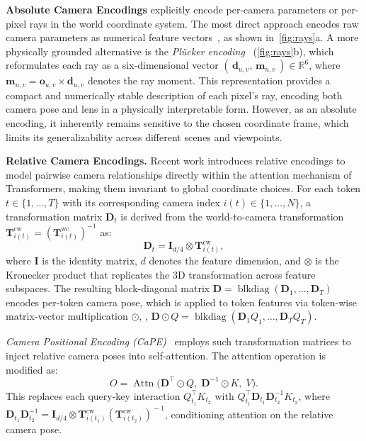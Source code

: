 \noindent\textbf{Absolute Camera Encodings}
{explicitly encode per-camera parameters or per-pixel rays in the world coordinate system.}
The most direct approach encodes raw camera parameters as numerical feature vectors~\cite{wang2024motionctrl,bai2025recammaster}, as shown in~\cref{fig:rays}a.
A more physically grounded alternative is the \emph{Pl\"ucker encoding}~\cite{bahmani2025ac3d,he2024cameractrl} (\cref{fig:rays}b), which reformulates each ray as a six-dimensional vector
\((\,\bm{d}_{{u},{v}},\, \bm{m}_{{u},{v}}\,) \in \mathbb{R}^6\),
where \(\bm{m}_{{u},{v}} = \bm{o}_{{u},{v}} \times \bm{d}_{{u},{v}}\) denotes the ray moment.
This representation provides a compact and numerically stable description of each pixel's ray, encoding both camera pose and lens in a physically interpretable form.
However, as an absolute encoding, it %
inherently remains sensitive to the chosen coordinate frame, which limits its generalizability across different scenes and viewpoints.

\noindent\textbf{Relative Camera Encodings.}
Recent work introduces relative encodings to model pairwise camera relationships directly within the attention mechanism of Transformers, making them invariant to global coordinate choices.
For each token \({t} \in \{1, \ldots, T\}\) with its corresponding camera index \({i}({t}) \in \{1, \ldots, N\}\),
a transformation matrix \(\mathbf{D}_{t}\) is derived from the world-to-camera transformation \(\mathbf{T}_{i({t})}^{\textrm{cw}} = (\mathbf{T}_{{i}({t})}^{\textrm{wc}})^{-1}\) as:
\begin{equation}
\mathbf{D}_{t} = \mathbf{I}_{{d}/4} \otimes \mathbf{T}_{{i}({t})}^{\textrm{cw}},
\label{eq:D_construct}
\end{equation}
where \(\mathbf{I}\) is the identity matrix, \({d}\) denotes the feature dimension, and \(\otimes\) is the Kronecker product that replicates the 3D transformation across feature subspaces.
The resulting block-diagonal matrix
\(\mathbf{D} = \operatorname{blkdiag}(\mathbf{D}_1,\ldots,\mathbf{D}_{T})\)
encodes per-token camera pose, which is applied to token features via token-wise matrix-vector multiplication \(\odot\),
\eg, \(\mathbf{D}\odot {Q} = \operatorname{blkdiag}(\mathbf{D}_1 {Q}_1, \ldots, \mathbf{D}_{T} {Q}_{T})\).

\emph{Camera Positional Encoding (CaPE)}~\cite{kong2024eschernet} employs such transformation matrices to inject relative camera poses into self-attention.
The attention operation is modified as:
\begin{equation}
{O}
= \operatorname{Attn}\big(\mathbf{D}^{\!\top}\!\odot {Q},\; \mathbf{D}^{-1}\!\odot {K},\; {V}\big).
\label{eq:cape}
\end{equation}
This replaces each query-key interaction \(Q_{{t}_1}^\top K_{{t}_2}\) with \({Q}_{{t}_1}^\top \mathbf{D}_{{t}_1} \! \mathbf{D}_{{t}_2}^{-1} {K}_{{t}_2}\),
where \(\mathbf{D}_{{t}_1} \! \mathbf{D}_{{t}_2}^{-1} = \mathbf{I}_{{d}/4} \!\otimes \mathbf{T}_{i({t}_1)}^{\textrm{cw}} \! (\mathbf{T}_{i({t}_2)}^{\textrm{cw}})^{\!-1}\),
conditioning attention on the relative camera pose.

